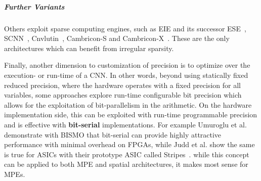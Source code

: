 \subparagraph{Further Variants}
Others exploit sparse computing engines, such as EIE and its successor ESE~\cite{han2017ese}, SCNN~\cite{parashar2017scnn}, Cnvlutin~\cite{cnvlutin}, Cambricon-S and Cambricon-X~\cite{zhang2016cambricon}. These are the only architectures which can benefit from irregular sparsity.


Finally, another dimension to customization of precision is to optimize over the execution- or run-time of a CNN.
In other words, beyond using statically fixed reduced precision, where the hardware operates with a fixed precision for all variables, some approaches explore run-time configurable bit precision which allows for the exploitation of bit-parallelism in the arithmetic. 
On the hardware implementation side, this can be exploited with run-time programmable precision and is effective with \textbf{bit-serial} implementations. 
For example Umuroglu et al.~\cite{umuroglu2018BISMO} demonstrate with BISMO that bit-serial can provide highly attractive performance with minimal overhead on FPGAs, while Judd et al. show the same is true for ASICs with their prototype ASIC called Stripes~\cite{judd2016stripes}. 
while this concept can be applied to both MPE and spatial architectures, it makes most sense for MPEs.


